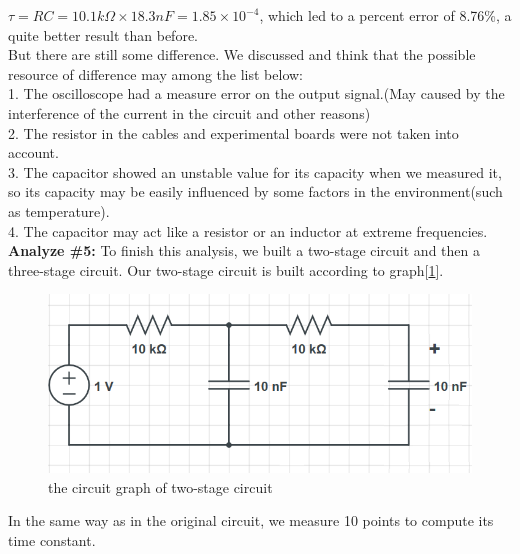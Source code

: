 $\tau = RC = 10.1k\Omega \times 18.3 nF = 1.85\times10^{-4}$, which led to a percent error of 8.76\%, a quite better result than before.\\
But there are still some difference. We discussed and think that the possible resource of difference may among the list below:\\
1. The oscilloscope had a measure error on the output signal.(May caused by the interference of the current in the circuit and other reasons)\\
2. The resistor in the cables and experimental boards were not taken into account.\\
3. The capacitor showed an unstable value for its capacity when we measured it, so its capacity may be easily influenced by some factors in the environment(such as temperature).\\
4. The capacitor may act like a resistor or an inductor at extreme frequencies.\\
\textbf{Analyze \#5:} \newline
\phantom{ } To finish this analysis, we built a two-stage circuit and then a three-stage circuit. Our two-stage circuit is built according to graph[\ref{fig:2.3}].\\
\begin{figure}[htbp]
	\centering %
	\includegraphics[width=\linewidth]{images/2_3.PNG} %
	\caption{the circuit graph of two-stage circuit} %
	\label{fig:2.3} %
\end{figure}
\phantom{ } In the same way as in the original circuit, we measure 10 points to compute its time constant.
